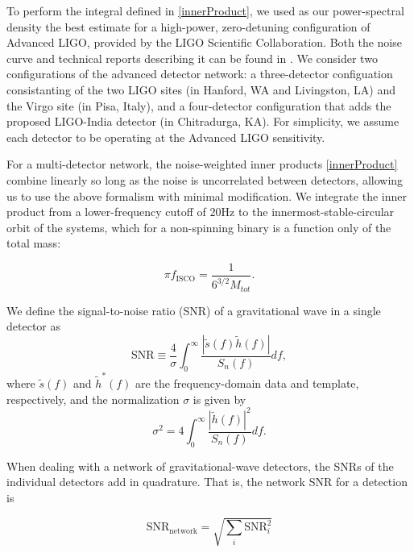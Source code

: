 \documentclass[11pt,a4paper]{emulateapj} 
\newcommand{\carl}[1]{{\color{red} #1}}
\begin{document}
To perform the integral defined in \eqref{innerProduct}, we used as
our power-spectral density the best estimate for a high-power,
zero-detuning configuration of Advanced LIGO, provided by the LIGO
Scientific Collaboration.  Both the noise curve and technical reports
describing it can be found in \cite{ADVLIGONoise}.  We consider two
configurations of the advanced detector network: a three-detector
configuation consistanting of the two LIGO sites (in Hanford, WA and
Livingston, LA) and the Virgo site (in Pisa, Italy), and a
four-detector configuration that adds the proposed LIGO-India detector
(in Chitradurga, KA).  For simplicity, we assume each detector to be
operating at the Advanced LIGO sensitivity.


For a multi-detector network, the noise-weighted inner products
\eqref{innerProduct} combine linearly \carl{so long as the noise is
uncorrelated between detectors}, allowing us to use the above
formalism with minimal modification.  We integrate the inner product
from a lower-frequency cutoff of $20\text{Hz}$ to the
innermost-stable-circular orbit of the systems, which for
a non-spinning binary is a function only of the total mass:

\begin{equation}
  \pi f_{\text{ISCO}} = \frac{1}{6^{3/2}M_{tot}}.
  \label{ISCOFrequency}
\end{equation}
   

We define the signal-to-noise ratio (SNR) of a gravitational wave in a
single detector as
\begin{equation}
  \text{SNR} \equiv \frac{4}{\sigma} \int^{\infty}_{0}\frac{|
    \tilde{s}(f)\tilde{h}(f)|}{S_{n}(f)}df,
  \label{formalSNR}
\end{equation}
where $\tilde s(f)$ and $\tilde{h}^{*}(f)$ are
the frequency-domain data and template, respectively, and the
normalization $\sigma$ is given by
\begin{equation}
  \sigma^2 = 4\int^{\infty}_{0}\frac{| \tilde{h}(f)|^2}{S_n(f)}df.
  \label{SNRnorm}
\end{equation}

\noindent When dealing with a network of gravitational-wave detectors, the SNRs
of the individual detectors add in quadrature.  That is, the network
SNR for a detection is

\begin{equation}
\text{SNR}_{\text{network}} = \sqrt{\sum_i \text{SNR}_{i}^2}
\label{SNRnetwork}
\end{equation}
\end{document}
